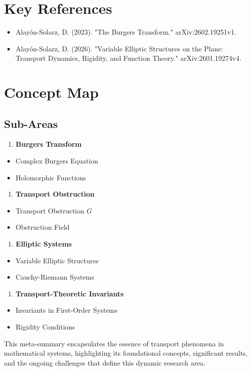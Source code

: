 \documentclass[11pt,a4paper]{article}
\begin{document}
\section{Key References}

\begin{itemize}
\item Alayón-Solarz, D. (2023). "The Burgers Transform." arXiv:2602.19251v1.
\item Alayón-Solarz, D. (2026). "Variable Elliptic Structures on the Plane: Transport Dynamics, Rigidity, and Function Theory." arXiv:2601.19274v4.
\end{itemize}

\section{Concept Map}

\subsection{Sub-Areas}

\begin{enumerate}
\item \textbf{Burgers Transform}
\end{enumerate}
\begin{itemize}
\item Complex Burgers Equation
\item Holomorphic Functions
\end{itemize}

\begin{enumerate}
\item \textbf{Transport Obstruction}
\end{enumerate}
\begin{itemize}
\item Transport Obstruction \( G \)
\item Obstruction Field
\end{itemize}

\begin{enumerate}
\item \textbf{Elliptic Systems}
\end{enumerate}
\begin{itemize}
\item Variable Elliptic Structures
\item Cauchy-Riemann Systems
\end{itemize}

\begin{enumerate}
\item \textbf{Transport-Theoretic Invariants}
\end{enumerate}
\begin{itemize}
\item Invariants in First-Order Systems
\item Rigidity Conditions
\end{itemize}

This meta-summary encapsulates the essence of transport phenomena in mathematical systems, highlighting its foundational concepts, significant results, and the ongoing challenges that define this dynamic research area.
\end{document}
